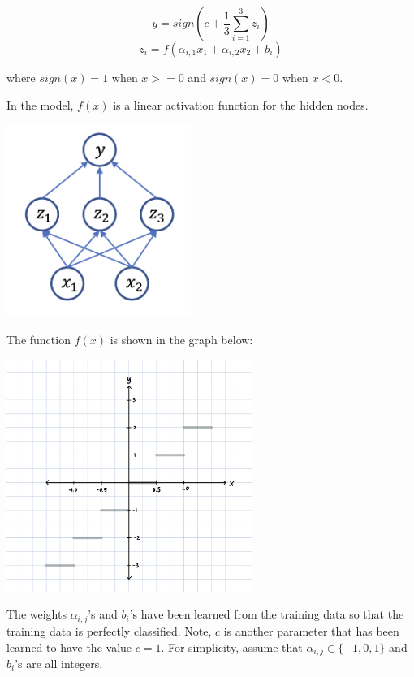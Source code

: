 \begin{parts}
$$y = sign(c + \frac{1}{3} \sum_{i=1}^3 z_i)$$
$$z_i = f (\alpha_{i,1} x_1 + \alpha_{i,2} x_2 + b_i)$$

\bigskip

where $sign(x) = 1$ when $x > = 0$ and $sign(x) = 0$ when $x < 0$.

In the model, $f(x)$ is a linear activation function for the hidden nodes.

\begin{center}
\includegraphics[width=6cm]{figures/nn.png}
\end{center}


\medskip

The function $f(x)$ is shown in the graph below:  

\begin{center}
\includegraphics[width=8cm]{figures/step.jpeg}
\end{center}

\begin{subparts}
    \subpart[] The weights $\alpha_{i,j}$'s and $b_i$'s have been learned from the training data so that the training data is perfectly classified. Note, $c$ is another parameter that has been learned to have the value $c = 1$. For simplicity, assume that $\alpha_{i,j} \in \{ -1, 0, 1 \}$ and $b_i$'s are all integers. 
    

\end{subparts}
\end{parts}
